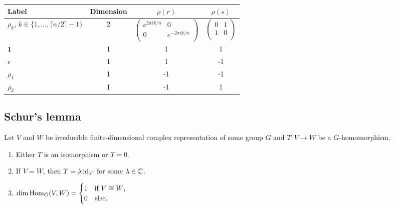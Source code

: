 \begin{center}
  \begin{tabular}{lccc}
    \toprule
    Label                                                  & Dimension & $\rho(r)$ & $\rho(s)$ \\
    \midrule
    $\rho_k$, $k \in \{1, \ldots, \lceil n/2 \rceil - 1\}$ & 2         &
    $\begin{pmatrix}
         e^{2\pi i k/n} & 0               \\
         0              & e^{-2\pi i k/n} \\
       \end{pmatrix}$                    &
    $\begin{pmatrix}
         0 & 1 \\
         1 & 0 \\
       \end{pmatrix}$
    \\
    $\bm 1$                                                & 1         & 1         & 1         \\
    $\epsilon$                                             & 1         & 1         & -1        \\
    $\rho_1$                                               & 1         & -1        & -1        \\
    $\rho_2$                                               & 1         & -1        & 1         \\
    \bottomrule
  \end{tabular}
\end{center}

\subsection{Schur's lemma}

\begin{theorem}
  Let $V$ and $W$ be irreducible finite-di\-men\-sion\-al complex representation of some group $G$ and $T: V \to W$ be a $G$-homomorphism.
  \begin{enumerate}
    \item Either $T$ is an isomorphism or $T = 0$.
    \item If $V = W$, then $T = \lambda \operatorname{id}_V$ for some $\lambda \in \mathbb{C}$.
    \item $\dim\operatorname{Hom}_G(V,W) =
            \begin{cases}
              1 & \text{if $V \cong W$,} \\
              0 & \text{else.}
            \end{cases}$
  \end{enumerate}
\end{theorem}

